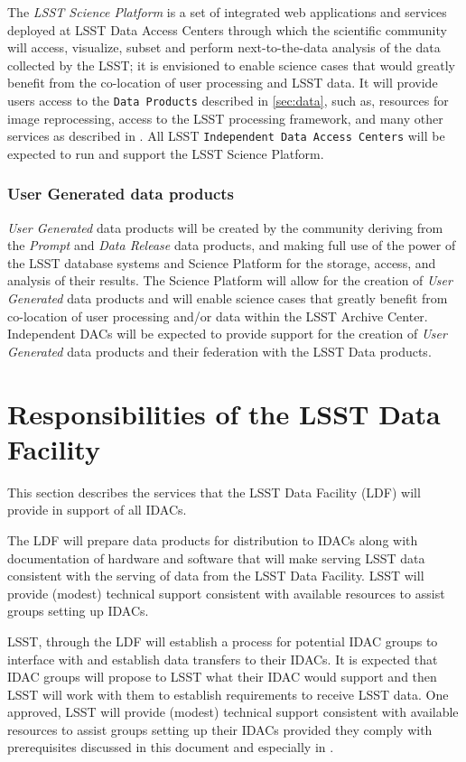 The {\it LSST Science Platform}   is a set of integrated web applications and services deployed at  LSST Data Access Centers through which the scientific community will access, visualize, subset and perform next-to-the-data analysis of the data collected by the LSST; it is envisioned to enable science cases that would greatly benefit from the co-location of user processing and LSST data. It will provide users access to the {\tt Data Products} described in \ref{sec:data}, such as, resources for image reprocessing, access to the LSST processing framework, and many other services as described in .  All LSST {\tt Independent Data Access Centers} will be expected to run and support the LSST Science Platform.

\subsubsection{User Generated data products }

{\it User Generated} data products will be created by the community deriving from the {\it Prompt} and {\it Data Release} data products, and making  full use of the power of the LSST database systems and
Science Platform for the storage, access, and analysis of their results.
The Science Platform will allow for the creation of {\it User Generated} data products and will enable science cases that greatly benefit from co-location of user processing and/or data within the LSST Archive Center.  Independent DACs will be expected to provide support for the creation of {\it User Generated} data products and their federation with the LSST Data products.

\section{Responsibilities of the LSST Data Facility}

This section describes the services that the LSST Data Facility (LDF) will provide in support of all  IDACs.

The LDF will prepare data products for distribution to IDACs along with documentation of hardware and software that will make serving LSST data consistent with the serving of data from the LSST Data Facility. LSST will provide (modest) technical support consistent with available resources to assist groups setting up IDACs.

LSST, through the LDF will establish a process for potential IDAC groups to interface with and establish data transfers to their IDACs. It is expected that IDAC groups will propose to LSST what their IDAC would support and then LSST will work with them to establish requirements to receive LSST data. One approved, LSST will provide (modest) technical support consistent with available resources to assist groups setting up their IDACs provided they comply with prerequisites discussed in this document and especially in .

